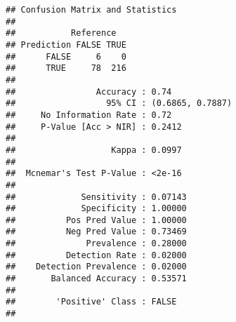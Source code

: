 \documentclass[]{article}
\begin{document}
\begin{verbatim}
## Confusion Matrix and Statistics
## 
##           Reference
## Prediction FALSE TRUE
##      FALSE     6    0
##      TRUE     78  216
##                                           
##                Accuracy : 0.74            
##                  95% CI : (0.6865, 0.7887)
##     No Information Rate : 0.72            
##     P-Value [Acc > NIR] : 0.2412          
##                                           
##                   Kappa : 0.0997          
##                                           
##  Mcnemar's Test P-Value : <2e-16          
##                                           
##             Sensitivity : 0.07143         
##             Specificity : 1.00000         
##          Pos Pred Value : 1.00000         
##          Neg Pred Value : 0.73469         
##              Prevalence : 0.28000         
##          Detection Rate : 0.02000         
##    Detection Prevalence : 0.02000         
##       Balanced Accuracy : 0.53571         
##                                           
##        'Positive' Class : FALSE           
## 
\end{verbatim}
\end{document}
